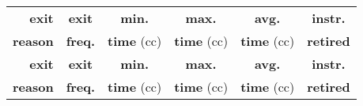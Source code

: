 \begin{longtable}{|r|c|c|c|c|c|}

	 \hline
	\textbf{exit}	& \textbf{exit}	 & \textbf{min.} 	& \textbf{max.} & \textbf{avg.} & \textbf{instr.}  \\
	\textbf{reason}	& \textbf{freq.} & \textbf{time} (cc)	& \textbf{time} (cc)	& \textbf{time} (cc)	& \textbf{retired}  \\ \hline
	 \hline
	\endfirsthead

	 \hline
	\textbf{exit}	& \textbf{exit}	 & \textbf{min.} 	& \textbf{max.} & \textbf{avg.} & \textbf{instr.}  \\
	\textbf{reason}	& \textbf{freq.} & \textbf{time} (cc)	& \textbf{time} (cc)	& \textbf{time} (cc)	& \textbf{retired}  \\ \hline
	 \hline
	\endhead


\end{longtable}
